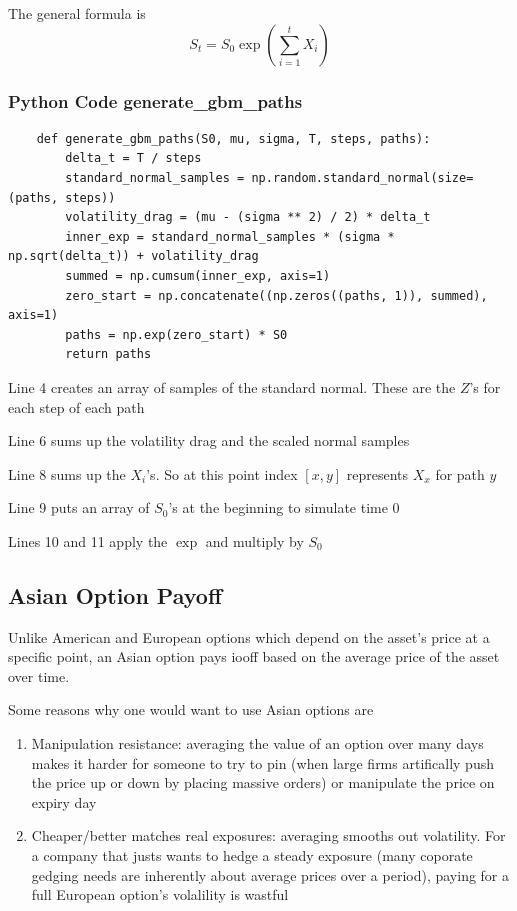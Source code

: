 \documentclass{article}
\begin{document}
The general formula is \[S_t=S_0\exp(\sum_{i=1}^{t}X_i)\]

\subsubsection*{Python Code generate\_gbm\_paths}

\begin{lstlisting}
    def generate_gbm_paths(S0, mu, sigma, T, steps, paths):
        delta_t = T / steps
        standard_normal_samples = np.random.standard_normal(size=(paths, steps))
        volatility_drag = (mu - (sigma ** 2) / 2) * delta_t
        inner_exp = standard_normal_samples * (sigma * np.sqrt(delta_t)) + volatility_drag
        summed = np.cumsum(inner_exp, axis=1)
        zero_start = np.concatenate((np.zeros((paths, 1)), summed), axis=1)
        paths = np.exp(zero_start) * S0
        return paths
\end{lstlisting}

Line 4 creates an array of samples of the standard normal. These are the \(Z\)'s for each step of each path

Line 6 sums up the volatility drag and the scaled normal samples

Line 8 sums up the \(X_i\)'s. So at this point index \([x,y]\) represents \(X_x\) for path \(y\)

Line 9 puts an array of \(S_0\)'s at the beginning to simulate time 0

Lines 10 and 11 apply the \(\exp\) and multiply by \(S_0\)

\subsection*{Asian Option Payoff}
Unlike American and European options which depend on the asset's price at a specific point, an Asian option pays iooff based on the average price of the asset over time.

Some reasons why one would want to use Asian options are 
\begin{enumerate}
    \item Manipulation resistance: averaging the value of an option over many days makes it harder for someone to try to pin (when large firms artifically push the price up or down by placing massive orders) or manipulate the price on expiry day
    \item Cheaper/better matches real exposures: averaging smooths out volatility. For a company that justs wants to hedge a steady exposure (many coporate gedging needs are inherently about average prices over a period), paying for a full European option's volalility is wastful
\end{enumerate}
\end{document}
